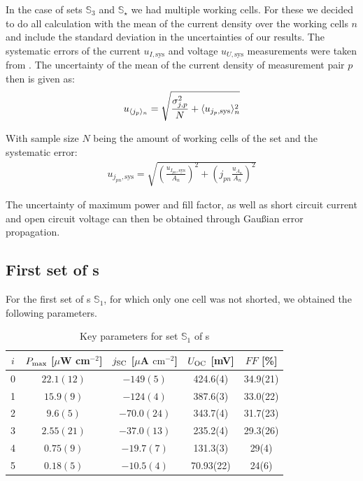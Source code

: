 \documentclass[a4paper,10pt,twocolumn]{article}
\begin{document}
\begin{extract*}
In the case of sets $\mathbb{S}_3$ and $\mathbb{S}_\star$ we had multiple working cells. For these we decided to do all calculation with the mean of the current density over the working cells $n$ and include the standard deviation in the uncertainties of our results. The systematic errors of the current $u_{I,\text{sys}}$ and voltage $u_{U,\text{sys}}$ measurements were taken from \cite{keithley}. The uncertainty of the mean of the current density of measurement pair $p$ then is given as:
\begin{align}
	u_{\langle j_p \rangle_n} = \sqrt{\frac{\sigma_{j,p}^2}{N} + \langle u_{j_p,\text{sys}} \rangle_n^2}
\end{align}

With sample size $N$ being the amount of working cells of the set and the systematic error:
\begin{align}
	u_{j_{pn},\text{sys}} = \sqrt{ \left( \frac{ u_{I_{pn},\text{sys}}}{A_n}\right)^2+\left( j_{pn}\frac{u_{A_n}}{A_n} \right)^2}
\end{align}

The uncertainty of maximum power and fill factor, as well as short circuit current and open circuit voltage can then be obtained through Gaußian error propagation.

\subsection{First set of \BHSC s}\label{subsec:S1data}

For the first set of \BHSC s $\mathbb{S}_1$, for which only one cell was not shorted, we obtained the following parameters.

\begin{table}[h]\centering
	\caption{Key parameters for set $\mathbb{S}_1$ of \BHSC s}
	\label{tab:keyparams1}
	\begin{tabular}{@{}ccccc@{}}\toprule
		$i$ & $P_{\text{max}}$ [$\mu$W cm$^{-2}$] & $j_{\text{SC}}$ [$\mu$A $\mathrm{cm}^{-2}$] & $U_{\text{OC}}$ [mV] & $FF$ [\%]\\\midrule
		0 &  $ 22.1(12) $ & $ -149(5) $ & 424.6(4) & 34.9(21) \\
		1 &  $ 15.9(9) $ & $ -124(4) $ & 387.6(3) & 33.0(22) \\
		2 &  $ 9.6(5) $ & $ -70.0(24) $ & 343.7(4) & 31.7(23) \\
		3 &  $ 2.55(21) $ & $ -37.0(13) $ & 235.2(4) & 29.3(26) \\
		4 &  $ 0.75(9) $ & $ -19.7(7) $ & 131.3(3) & 29(4)\\
		5 &  $ 0.18(5) $ & $ -10.5(4) $ & 70.93(22) & 24(6) \\\bottomrule
	\end{tabular}
\end{table}


\end{extract*}
\end{document}
